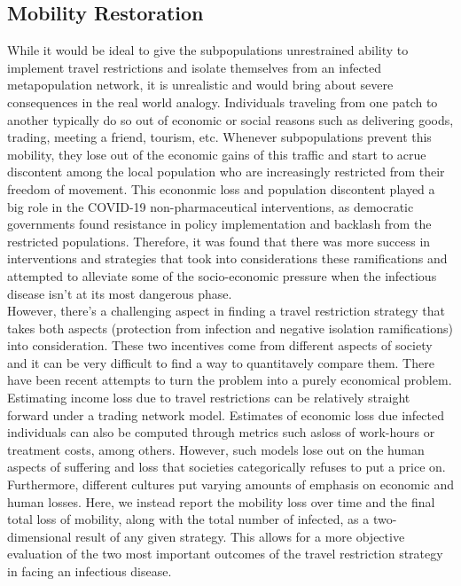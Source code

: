 \subsection{Mobility Restoration}
While it would be ideal to give the subpopulations unrestrained ability to implement travel restrictions and isolate themselves from an infected metapopulation network, it is unrealistic and would bring about severe consequences in the real world analogy. Individuals traveling from one patch to another typically do so out of economic or social reasons such as delivering goods, trading, meeting a friend, tourism, etc. Whenever subpopulations prevent this mobility, they lose out of the economic gains of this traffic and start to acrue discontent among the local population who are increasingly restricted from their freedom of movement. This econonmic loss and population discontent played a big role in the COVID-19 non-pharmaceutical interventions, as democratic governments found resistance in policy implementation and backlash from the restricted populations. Therefore, it was found that there was more success in interventions and strategies that took into considerations these ramifications and attempted to alleviate some of the socio-economic pressure when the infectious disease isn't at its most dangerous phase. \\

However, there's a challenging aspect in finding a travel restriction strategy that takes both aspects (protection from infection and negative isolation ramifications) into consideration. These two incentives come from different aspects of society and it can be very difficult to find a way to quantitavely compare them. There have been recent attempts to turn the problem into a purely economical problem. Estimating income loss due to travel restrictions can be relatively straight forward under a trading network model. Estimates of economic loss due infected individuals can also be computed through metrics such asloss of work-hours or treatment costs, among others. However, such models lose out on the human aspects of suffering and loss that societies categorically refuses to put a price on. Furthermore, different cultures put varying amounts of emphasis on economic and human losses. Here, we instead report the mobility loss over time and the final total loss of mobility, along with the total number of infected, as a two-dimensional result of any given strategy. This allows for a more objective evaluation of the two most important outcomes of the travel restriction strategy in facing an infectious disease.\\

